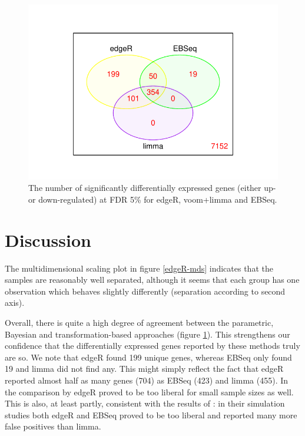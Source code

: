 \documentclass[a4paper,10pt]{article}\usepackage[]{graphicx}\usepackage[]{color}
\makeatletter
\def\maxwidth{ %
  \ifdim\Gin@nat@width>\linewidth
    \linewidth
  \else
    \Gin@nat@width
  \fi
}
\newenvironment{knitrout}{}{} %
\makeatother
\begin{document}
\begin{figure}[H]
\centering
\begin{knitrout}
\color{fgcolor}

{\centering \includegraphics[width=\maxwidth]{figures/plots-venn-diagram-edge-limma-ebseq-1} 

}



\end{knitrout}
\caption{The number of significantly differentially expressed genes (either up- or down-regulated) at FDR 5\% for edgeR, voom+limma and EBSeq.}
\label{venn-simple}
\end{figure}

\section{Discussion}
The multidimensional scaling plot in figure \ref{edgeR-mds} indicates that the samples are reasonably well separated, although it seems that each group has one observation which behaves slightly differently (separation according to second axis).

Overall, there is quite a high degree of agreement between the parametric, Bayesian and transformation-based approaches (figure \ref{venn-simple}). This strengthens our confidence that the differentially expressed genes reported by these methods truly are so. We note that edgeR found 199 unique genes, whereas EBSeq only found 19 and limma did not find any. This might simply reflect the fact that edgeR reported almost half as many genes (704) as EBSeq (423) and limma (455). In the comparison by \textcite{soneson_comparison_2013} edgeR proved to be too liberal for small sample sizes as well. This is also, at least partly, consistent with the results of \textcite{seyednasrollah_comparison_2015}: in their simulation studies both edgeR and EBSeq proved to be too liberal and reported many more false positives than limma.
\end{document}
